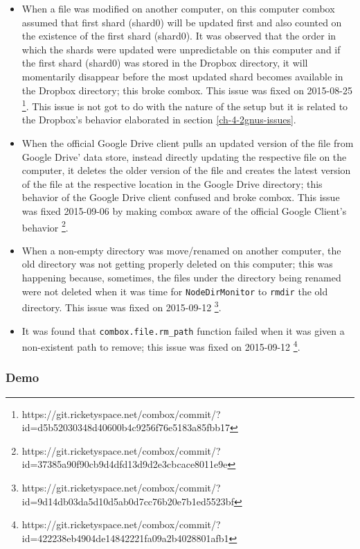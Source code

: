 \begin{itemize}
\item When a file was modified on another computer, on this computer
  combox assumed that first shard (shard0) will be updated first and
  also counted on the existence of the first shard (shard0). It was
  observed that the order in which the shards were updated were
  unpredictable on this computer and if the first shard (shard0) was
  stored in the Dropbox directory, it will momentarily disappear
  before the most updated shard becomes available in the Dropbox
  directory; this broke combox. This issue was fixed on 2015-08-25
  \footnote{https://git.ricketyspace.net/combox/commit/?id=d5b52030348d40600b4c9256f76e5183a85fbb17}. This
  issue is not got to do with the nature of the setup but it is
  related to the Dropbox's behavior elaborated in section
  \ref{ch-4-2gnus-issues}.
\item When the official Google Drive client pulls an updated version
  of the file from Google Drive' data store, instead directly updating
  the respective file on the computer, it deletes the older version of
  the file and creates the latest version of the file at the
  respective location in the Google Drive directory; this behavior of
  the Google Drive client confused and broke combox. This issue was
  fixed 2015-09-06 by making combox aware of the official Google
  Client's behavior
  \footnote{https://git.ricketyspace.net/combox/commit/?id=37385a90f90cb9d4dfd13d9d2e3cbcace8011e9e}.
\item When a non-empty directory was move/renamed on another computer,
  the old directory was not getting properly deleted on this computer;
  this was happening because, sometimes, the files under the directory
  being renamed were not deleted when it was time for
  \verb+NodeDirMonitor+ to \verb+rmdir+ the old directory. This issue
  was fixed on 2015-09-12
  \footnote{https://git.ricketyspace.net/combox/commit/?id=9d14db03da5d10d5ab0d7cc76b20e7b1ed5523bf}.
\item It was found that \verb+combox.file.rm_path+ function failed
  when it was given a non-existent path to remove; this issue was
  fixed on 2015-09-12
  \footnote{https://git.ricketyspace.net/combox/commit/?id=422238eb4904de14842221fa09a2b4028801afb1}.
\end{itemize}

\subsubsection{Demo}

